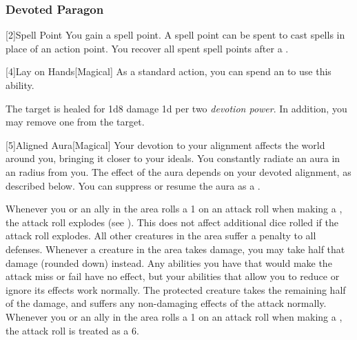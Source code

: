         \subsubsection{Devoted Paragon}

            [2]{Spell Point}
            You gain a spell point.
            A spell point can be spent to cast spells in place of an action point.
            You recover all spent spell points after a .

            [4]{Lay on Hands}[Magical] As a standard action, you can spend an  to use this ability.
            \begin{ability}
                \begin{spelltargetinginfo}
                \end{spelltargetinginfo}
                \begin{spelleffects}
                    \spelleffect The target is healed for 1d8 damage \add 1d per two \textit{devotion power}.
                    In addition, you may remove one  from the target.
                \end{spelleffects}
            \end{ability}

            [5]{Aligned Aura}[Magical]
            Your devotion to your alignment affects the world around you, bringing it closer to your ideals.
            You constantly radiate an aura in an \areamed radius  from you.
            The effect of the aura depends on your devoted alignment, as described below.
            You can suppress or resume the aura as a .

             Whenever you or an ally in the area rolls a 1 on an attack roll when making a , the attack roll explodes (see ).
            This does not affect additional dice rolled if the attack roll explodes.
             All other creatures in the area suffer a  penalty to all defenses.
             Whenever a creature in the area takes damage, you may take half that damage (rounded down) instead.
            Any abilities you have that would make the attack miss or fail have no effect, but your abilities that allow you to reduce or ignore its effects work normally.
            The protected creature takes the remaining half of the damage, and suffers any non-damaging effects of the attack normally.
             Whenever you or an ally in the area rolls a 1 on an attack roll when making a , the attack roll is treated as a 6.

